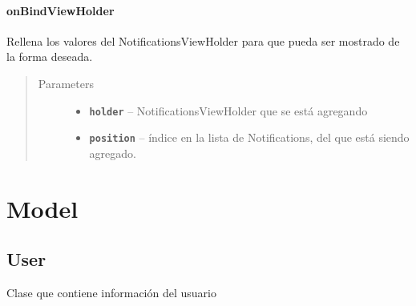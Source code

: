 \documentclass[letterpaper,10pt,english]{sphinxmanual}
\begin{document}
\subsubsection{onBindViewHolder}
\label{Adapter/NotificationsAdapter:onbindviewholder}

\begin{fulllineitems}
\label{Adapter/NotificationsAdapter:com.fiuba.tallerii.jobify.NotificationAdapter.onBindViewHolder(NotificationsViewHolder, int)}
Rellena los valores del NotificationsViewHolder para que pueda ser mostrado de la forma deseada.
\begin{quote}\begin{description}
\item[{Parameters}] \leavevmode\begin{itemize}
\item {} 
\textbf{\texttt{holder}} -- NotificationsViewHolder que se está agregando

\item {} 
\textbf{\texttt{position}} -- índice en la lista de Notifications, del  que está siendo agregado.

\end{itemize}

\end{description}\end{quote}

\end{fulllineitems}



\chapter{Model}
\label{Model/package-index:model}\label{Model/package-index::doc}

\section{User}
\label{Model/User::doc}\label{Model/User:user}

\begin{fulllineitems}
\label{Model/User:com.fiuba.tallerii.jobify.User}
Clase que contiene información del usuario

\end{fulllineitems}
\end{document}
